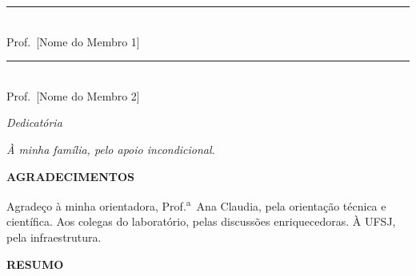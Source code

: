 \documentclass[12pt,a4paper]{article}
\begin{document}
\vspace{0.8cm}
\noindent\rule{10cm}{0.4pt}\\
Prof.\ [Nome do Membro 1]\\
[Institui\c{c}\~{a}o]

\vspace{0.8cm}
\noindent\rule{10cm}{0.4pt}\\
Prof.\ [Nome do Membro 2]\\
[Institui\c{c}\~{a}o]

\newpage

\begin{center}\textit{Dedicat\'{o}ria}\end{center}
\vfill
\begin{flushright}
\textit{\`{A} minha fam\'{i}lia, pelo apoio incondicional.}
\end{flushright}
\vfill
\newpage

\begin{center}\textbf{AGRADECIMENTOS}\end{center}
\noindent
Agrade\c{c}o \`{a} minha orientadora, Prof.\textsuperscript{a}\ Ana Claudia,
pela orienta\c{c}\~{a}o t\'{e}cnica e cient\'{i}fica.
Aos colegas do laborat\'{o}rio, pelas discuss\~{o}es enriquecedoras.
\`{A} UFSJ, pela infraestrutura.
\newpage

\begin{center}\textbf{RESUMO}\end{center}
\end{document}
